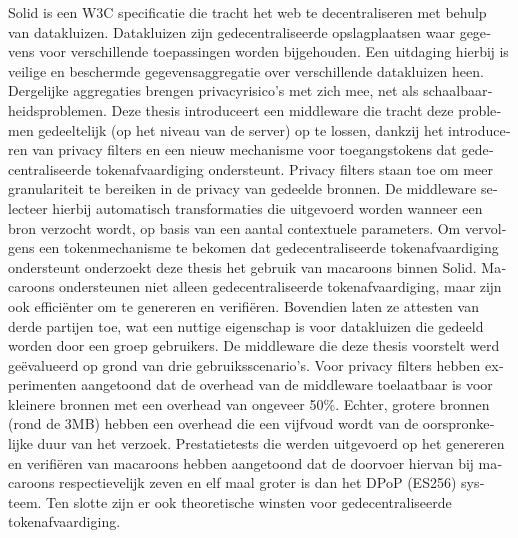 \begin{otherlanguage}{dutch}
{\small Solid is een W3C specificatie die tracht het web te decentraliseren met behulp van datakluizen. Datakluizen zijn gedecentraliseerde opslagplaatsen waar gegevens voor verschillende toepassingen worden bijgehouden. Een uitdaging hierbij is veilige en beschermde gegevensaggregatie over verschillende datakluizen heen. Dergelijke aggregaties brengen privacyrisico's met zich mee, net als schaalbaarheidsproblemen. Deze thesis introduceert een middleware die tracht deze problemen gedeeltelijk (op het niveau van de server) op te lossen, dankzij het introduceren van privacy filters en een nieuw mechanisme voor toegangstokens dat gedecentraliseerde tokenafvaardiging ondersteunt.
Privacy filters staan toe om meer granulariteit te bereiken in de privacy van gedeelde bronnen. De middleware selecteer hierbij automatisch transformaties die uitgevoerd worden wanneer een bron verzocht wordt, op basis van een aantal contextuele parameters. Om vervolgens een tokenmechanisme te bekomen dat gedecentraliseerde tokenafvaardiging ondersteunt onderzoekt deze thesis het gebruik van macaroons binnen Solid. Macaroons ondersteunen niet alleen gedecentraliseerde tokenafvaardiging, maar zijn ook effici{\"e}nter om te genereren en verifi{\"e}ren. Bovendien laten ze attesten van derde partijen toe, wat een nuttige eigenschap is voor datakluizen die gedeeld worden door een groep gebruikers.
De middleware die deze thesis voorstelt werd ge{\"e}valueerd op grond van drie gebruiksscenario's. Voor privacy filters hebben experimenten aangetoond dat de overhead van de middleware toelaatbaar is voor kleinere bronnen met een overhead van ongeveer 50\%. Echter, grotere bronnen (rond de 3MB) hebben een overhead die een vijfvoud wordt van de oorspronkelijke duur van het verzoek. 
Prestatietests die werden uitgevoerd op het genereren en verifi{\"e}ren van macaroons hebben aangetoond dat de doorvoer hiervan bij macaroons respectievelijk zeven en elf maal groter is dan het DPoP (ES256) systeem. Ten slotte zijn er ook theoretische winsten voor gedecentraliseerde tokenafvaardiging.}
\end{otherlanguage}
\\